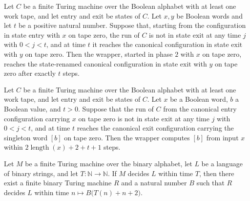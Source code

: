 \begin{lemma}
\label{Complexity.a3_run_call}
\leanok
{}
Let $C$ be a finite Turing machine over the Boolean alphabet with at least one work
tape, and let $\mathrm{entry}$ and $\mathrm{exit}$ be states of $C$. Let $x,y$ be
Boolean words and let $t$ be a positive natural number. Suppose that, starting from the
configuration in state $\mathrm{entry}$ with $x$ on tape zero, the run of $C$ is not in
state $\mathrm{exit}$ at any time $j$ with $0<j<t$, and at time $t$ it reaches the
canonical configuration in state $\mathrm{exit}$ with $y$ on tape zero. Then the
wrapper, started in phase $2$ with $x$ on tape zero, reaches the state-renamed canonical
configuration in state $\mathrm{exit}$ with $y$ on tape zero after exactly $t$ steps.
\end{lemma}

\begin{lemma}
\label{Complexity.a3_run_singleton}
\leanok
{}
Let $C$ be a finite Turing machine over the Boolean alphabet with at least one work
tape, and let $\mathrm{entry}$ and $\mathrm{exit}$ be states of $C$. Let $x$ be a
Boolean word, $b$ a Boolean value, and $t>0$. Suppose that the run of $C$ from the
canonical entry configuration carrying $x$ on tape zero is not in state $\mathrm{exit}$
at any time $j$ with $0<j<t$, and at time $t$ reaches the canonical exit configuration
carrying the singleton word $[b]$ on tape zero. Then the wrapper computes $[b]$ from
input $x$ within $2\operatorname{length}(x)+2+t+1$ steps.
\end{lemma}

\begin{lemma}
\label{Complexity.a3_decider_clean}
\leanok
{}
Let $M$ be a finite Turing machine over the binary alphabet, let $L$ be a language of
binary strings, and let $T:\mathbb{N}\to\mathbb{N}$. If $M$ decides $L$ within time $T$,
then there exist a finite binary Turing machine $R$ and a natural number $B$ such that
$R$ decides $L$ within time $n\mapsto B\bigl(T(n)+n+2\bigr)$.
\end{lemma}


